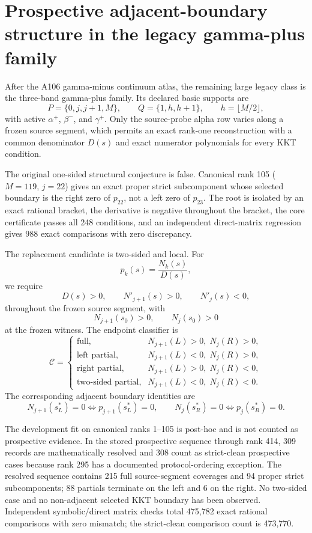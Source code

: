 \section{Prospective adjacent-boundary structure in the legacy gamma-plus family}

After the A106 gamma-minus continuum atlas, the remaining large legacy class is the three-band gamma-plus family. Its declared basic supports are
\[
P=\{0,j,j+1,M\},\qquad Q=\{1,h,h+1\},\qquad h=\lfloor M/2\rfloor,
\]
with active $\alpha^+$, $\beta^-$, and $\gamma^+$. Only the source-probe alpha row varies along a frozen source segment, which permits an exact rank-one reconstruction with a common denominator $D(s)$ and exact numerator polynomials for every KKT condition.

The original one-sided structural conjecture is false. Canonical rank 105 ($M=119$, $j=22$) gives an exact proper strict subcomponent whose selected boundary is the right zero of $p_{22}$, not a left zero of $p_{23}$. The root is isolated by an exact rational bracket, the derivative is negative throughout the bracket, the core certificate passes all 248 conditions, and an independent direct-matrix regression gives 988 exact comparisons with zero discrepancy.

The replacement candidate is two-sided and local. For
\[
p_k(s)=\frac{N_k(s)}{D(s)},
\]
we require
\[
D(s)>0,\qquad N'_{j+1}(s)>0,\qquad N'_j(s)<0,
\]
throughout the frozen source segment, with
\[
N_{j+1}(s_0)>0,\qquad N_j(s_0)>0
\]
at the frozen witness. The endpoint classifier is
\[
\mathcal C=
\begin{cases}
\text{full}, & N_{j+1}(L)>0,\;N_j(R)>0,\\
\text{left partial}, & N_{j+1}(L)<0,\;N_j(R)>0,\\
\text{right partial}, & N_{j+1}(L)>0,\;N_j(R)<0,\\
\text{two-sided partial}, & N_{j+1}(L)<0,\;N_j(R)<0.
\end{cases}
\]
The corresponding adjacent boundary identities are
\[
N_{j+1}(s_L^*)=0\iff p_{j+1}(s_L^*)=0,
\qquad
N_j(s_R^*)=0\iff p_j(s_R^*)=0.
\]

The development fit on canonical ranks 1--105 is post-hoc and is not counted as prospective evidence. In the stored prospective sequence through rank 414, 309 records are mathematically resolved and 308 count as strict-clean prospective cases because rank 295 has a documented protocol-ordering exception. The resolved sequence contains 215 full source-segment coverages and 94 proper strict subcomponents; 88 partials terminate on the left and 6 on the right. No two-sided case and no non-adjacent selected KKT boundary has been observed. Independent symbolic/direct matrix checks total 475,782 exact rational comparisons with zero mismatch; the strict-clean comparison count is 473,770.

